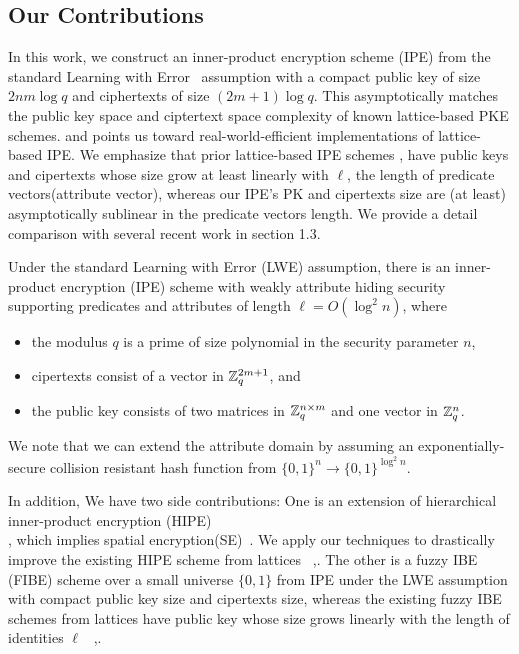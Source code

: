 \subsection{Our Contributions}
In this work, we construct an inner-product encryption scheme (IPE) from the standard Learning with Error~ \cite{STOC:Regev05} assumption with a compact public key of size $2nm\log q$ and ciphertexts of size $(2m+1)\log q$. This asymptotically matches the public key space and ciptertext space complexity of known lattice-based PKE schemes. and points us toward real-world-efficient implementations of lattice-based IPE. We emphasize that prior lattice-based IPE schemes \cite{AC:AgrFreVai11}, \cite{PKC:Xagawa13} have public keys and cipertexts whose size grow at least linearly with $\ell$, the length of predicate vectors(attribute vector), whereas our IPE's PK and cipertexts size are (at least) asymptotically sublinear in the predicate vectors length. We provide a detail comparison with several recent work in section 1.3.
\begin{theorem}[Main]
Under the standard Learning with Error (LWE) assumption, there is an inner-product encryption (IPE) scheme with weakly attribute hiding security supporting predicates and attributes of length $\ell=O(\log^{2} n)$, where
\begin{itemize}
 \item the modulus $q$ is a prime of size polynomial in the security parameter $n$,\\
 \item cipertexts consist of a vector in $\mathbb{Z}^{2m+1}_{q}$, and\\
 \item the public key consists of two matrices in $\mathbb{Z}^{n \times m}_{q}$ and one vector in $\mathbb{Z}^{n}_{q}$.
\end{itemize}
\end{theorem}
We note that we can extend the attribute domain by assuming an exponentially-secure collision resistant hash function from $\{0,1\}^{n}\rightarrow \{0,1\}^{\log^{2}n}$.\

In addition, We have two side contributions: One is an extension of hierarchical inner-product encryption (HIPE)\\ \cite{AC:OkaTak09}, which implies spatial encryption(SE)~\cite{AC:BonHam08}. We apply our techniques to drastically improve the existing HIPE scheme from lattices ~\cite{LC:AbdDeCMoc12},\cite{PKC:Xagawa13}. The other is a fuzzy IBE (FIBE) scheme over a small universe $\{0,1\}$ from IPE under the LWE assumption with compact public key size and cipertexts size, whereas the existing fuzzy IBE schemes from lattices have public key whose size grows linearly with  the length of identities $\ell$~ \cite{PKC:ABVVW12},\cite{PKC:Xagawa13}.

